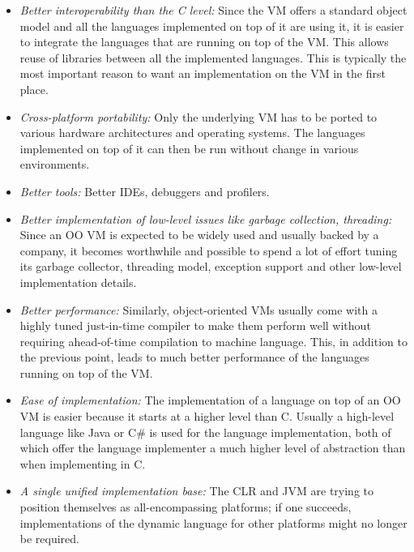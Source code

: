 \documentclass{llncs}
\begin{document}
\begin{itemize}
\item
\emph{Better interoperability than the C level:} Since the VM offers a standard
object model and all the languages implemented on top of it are using it, it is
easier to integrate the languages that are running on top of the VM. This
allows reuse of libraries between all the implemented languages. This is
typically the most important reason to want an implementation on the VM in
the first place.

\item
\emph{Cross-platform portability:} Only the underlying VM has to be ported to
various hardware architectures and operating systems. The languages implemented
on top of it can then be run without change in various environments.

\item
\emph{Better tools:} Better IDEs, debuggers and profilers.

\item
\emph{Better implementation of low-level issues like garbage collection,
threading:} Since an OO VM is expected to be widely used and usually backed by
a company, it becomes worthwhile and possible to spend a lot of effort tuning
its garbage collector, threading model, exception support and other low-level
implementation details.

\item
\emph{Better performance:} Similarly, object-oriented VMs usually come with a
highly tuned just-in-time compiler to make them perform well without requiring
ahead-of-time compilation to machine language. This, in addition to the
previous point, leads to much better performance of the languages running on top
of the VM.

\item
\emph{Ease of implementation:} The implementation of a language on top of an OO
VM is easier because it starts at a higher level than C. Usually a
high-level language like Java or C\# is used for the language implementation,
both of which offer the language implementer a much higher level of abstraction
than when implementing in C. 

\item
\emph{A single unified implementation base:} The CLR and JVM are trying
to position themselves as all-encompassing platforms; if one succeeds,
implementations of the dynamic language for other platforms might no longer
be required.
\end{itemize}
\end{document}
